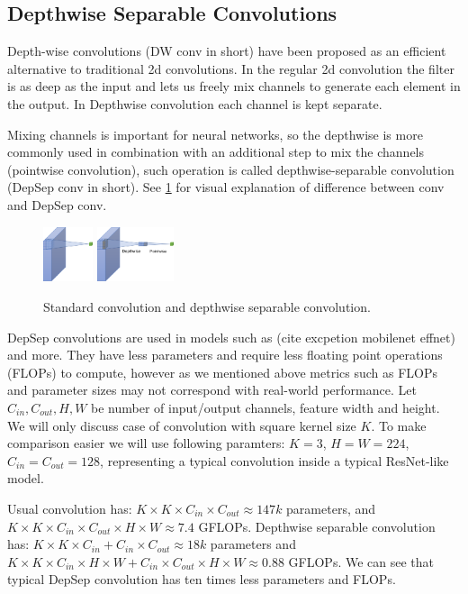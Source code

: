 \subsection{Depthwise Separable Convolutions}

Depth-wise convolutions (DW conv in short) have been proposed as an efficient alternative to traditional 2d convolutions. In the regular 2d convolution the filter is as deep as the input and lets us freely mix channels to generate each element in the output. In Depthwise convolution each channel is kept separate. 

Mixing channels is important for  neural networks, so the depthwise is more commonly used in combination with an additional step to mix the channels (pointwise convolution), such operation is called depthwise-separable convolution (DepSep conv in short). See \ref{fig: convs} for visual explanation of difference between conv and DepSep conv. 

\begin{figure}[h]
    \centering
         \includegraphics[width=0.13\textwidth]{images/conv.pdf}
         \hfil
         \includegraphics[width=0.2\textwidth]{images/conv_DepSep.pdf}
    \caption{Standard convolution and depthwise separable convolution.}   \label{fig: convs}
    \end{figure}


DepSep convolutions are used in models such as (cite excpetion mobilenet effnet) and more. They have less parameters and require less floating point operations (FLOPs) to compute, however as we mentioned above metrics such as FLOPs and parameter sizes may not correspond with real-world performance. Let $C_{in}, C_{out}, H, W$ be number of input/output channels, feature width and height. We will only discuss case of convolution with square kernel size $K$. To make comparison easier we will use following paramters: $K=3$, $H=W=224$, $C_{in} = C_{out}=128$, representing a typical convolution inside a typical ResNet-like model.  

Usual convolution has: $ K \times K \times C_{in} \times C_{out} \approx 147k$ parameters, and $ K \times K \times C_{in} \times C_{out} \times H \times W \approx 7.4 $ GFLOPs. Depthwise separable convolution has: $ K \times K \times C_{in} + C_{in} \times C_{out} \approx 18k$ parameters and $ K \times K \times C_{in} \times H \times W + C_{in} \times C_{out} \times H \times W \approx 0.88$ GFLOPs. We can see that typical DepSep convolution has ten times less parameters and FLOPs.

